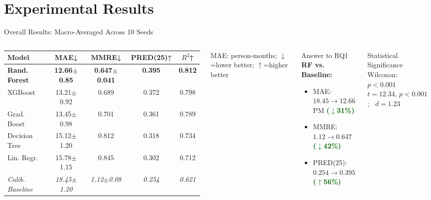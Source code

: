 \documentclass[aspectratio=169]{beamer}
\begin{document}
\section{Experimental Results}

\begin{frame}{Overall Results: Macro-Averaged Across 10 Seeds}
\begin{columns}[T]
\begin{table}
\centering
{\setlength{\tabcolsep}{3pt}\scriptsize
\begin{tabular}{lcccc}
\toprule
\textbf{Model} & \textbf{MAE↓} & \textbf{MMRE↓} & \textbf{PRED(25)↑} & $R^2$↑ \\
\midrule
\textbf{Rand. Forest}  & \textbf{12.66{\tiny$\pm$0.85}} & \textbf{0.647{\tiny$\pm$0.041}} & \textbf{0.395} & \textbf{0.812} \\
XGBoost       & 13.21{\tiny$\pm$0.92} & 0.689 & 0.372 & 0.798 \\
Grad. Boost   & 13.45{\tiny$\pm$0.98} & 0.701 & 0.361 & 0.789 \\
Decision Tree & 15.12{\tiny$\pm$1.20} & 0.812 & 0.318 & 0.734 \\
Lin. Regr.    & 15.78{\tiny$\pm$1.15} & 0.845 & 0.302 & 0.712 \\
\midrule
\textit{Calib. Baseline} & \textit{18.45{\tiny$\pm$1.20}} & \textit{1.12{\tiny$\pm$0.08}} & \textit{0.254} & \textit{0.621} \\
\bottomrule
\end{tabular}}
\end{table}
{\tiny MAE: person-months; $\downarrow$=lower better; $\uparrow$=higher better}

\begin{exampleblock}{Answer to RQ1}
\footnotesize\textbf{RF vs. Baseline:}
\begin{itemize}\footnotesize
    \item MAE: $18.45\!\to\!12.66$ PM \textcolor{darkgreen}{\textbf{($\downarrow$31\%)}}
    \item MMRE: $1.12\!\to\!0.647$ \textcolor{darkgreen}{\textbf{($\downarrow$42\%)}}
    \item PRED(25): $0.254\!\to\!0.395$ \textcolor{darkgreen}{\textbf{($\uparrow$56\%)}}
\end{itemize}
\end{exampleblock}

\vspace{0.1cm}
\begin{alertblock}{Statistical Significance}
\footnotesize Wilcoxon: $p < 0.001$\\
$t{=}12.34$, $p{<}0.001$;~ $d{=}1.23$
\end{alertblock}
\end{columns}
\end{frame}
\end{document}

